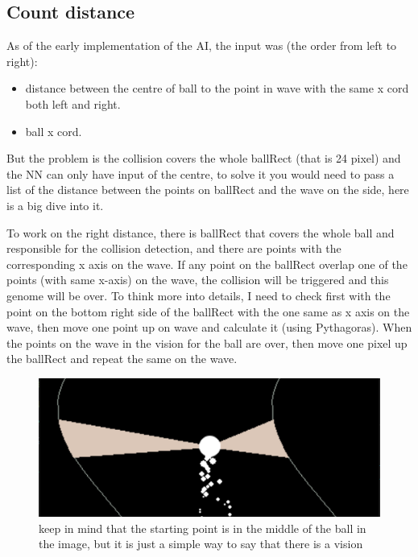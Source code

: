 \subsection{Count distance}\label{sec:count-distance}
As of the early implementation of the AI, the input was (the order from left to right):
\begin{itemize}
\item distance between the centre of ball to the point in wave with the same x cord both left and right.
\item ball x cord.
\end{itemize}

But the problem is the collision covers the whole ballRect (that is 24 pixel) and the NN can only have input of the centre, to solve it you would need to pass a list of the distance between the points on ballRect and the wave on the side, here is a big dive into it.

To work on the right distance, there is ballRect that covers the whole ball and responsible for the collision detection, and there are points with the corresponding x axis on the wave. If any point on the ballRect overlap one of the points (with same x-axis) on the wave, the collision will be triggered and this genome will be over. To think more into details, I need to check first with the point on the bottom right side of the ballRect with the one same as x axis on the wave, then move one point up on wave and calculate it (using Pythagoras). When the points on the wave in the vision for the ball are over, then move one pixel up the ballRect and repeat the same on the wave.
\begin{figure}[H]
	\centering
	\includegraphics[width=0.7\linewidth]{"usedImages/vision 576 lines"}
	\caption{keep in mind that the starting point is in the middle of the ball in the image, but it is just a simple way to say that there is a vision}
	\label{fig:vision-576-lines}
\end{figure}

